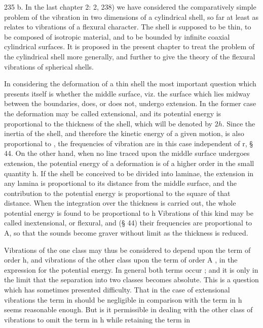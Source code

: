 235 b. In the last chapter 2: 2, 238) we
have considered the comparatively simple problem of the vibration in two
dimensions of a cylindrical shell, so far at least as relates to vibrations of
a flexural character. The shell is supposed to be thin, to be composed of
isotropic material, and to be bounded by infinite coaxial cylindrical surfaces.
It is proposed in the present chapter to treat the problem of the cylindrical
shell more generally, and further to give the theory of the flexural vibrations
of spherical shells.

In considering the deformation of a thin shell the most important question
which presents itself is whether the middle surface, viz. the surface which
lies midway between the boundaries, does, or does not, undergo extension. In
the former case the deformation may be called extensional, and its potential
energy is proportional to the thickness of the shell, which will be denoted by
\(2h\). Since the inertia of the shell, and therefore the kinetic energy of a given
motion, is also proportional to , the frequencies of vibration are in this
case independent of r, § 44. On the other hand, when no line traced upon the
middle surface undergoes extension, the potential energy of a deformation is of
a higher order in the small quantity h. If the shell be conceived to be divided
into laminae, the extension in any lamina is proportional to its distance from
the middle surface, and the contribution to the potential energy is
proportional to the square of that distance. When the integration over the
thickness is carried out, the whole potential energy is found to be
proportional to h Vibrations of this kind may be called inextensional, or
flexural, and (§ 44) their frequencies are proportional to A, so that the
sounds become graver without limit as the thickness is reduced.

Vibrations of the one class may thus be considered to depend upon the term of
order h, and vibrations of the other class upon the term of order A , in the
expression for the potential energy.  In general both terms occur ; and it is
only in the limit that the separation into two classes becomes absolute. This
is a question which has sometimes presented difficulty. That in the case of
extensional vibrations the term in should be negligible in comparison with the
term in h seems reasonable enough. But is it permissible in dealing with the
other class of vibrations to omit the term in h while retaining the term in

